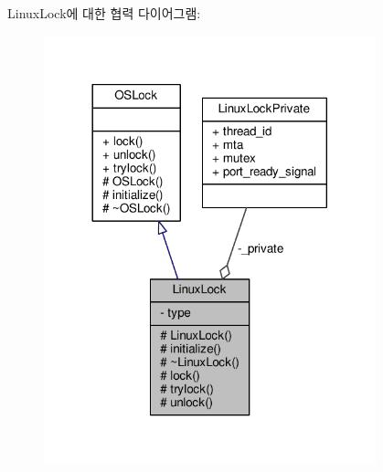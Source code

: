 Linux\+Lock에 대한 협력 다이어그램\+:
\nopagebreak
\begin{figure}[H]
\begin{center}
\leavevmode
\includegraphics[width=272pt]{class_linux_lock__coll__graph}
\end{center}
\end{figure}
